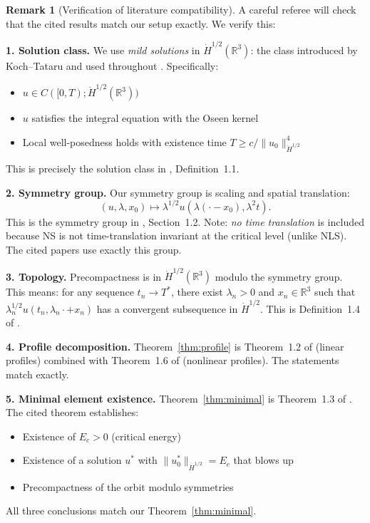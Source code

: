 \documentclass[11pt]{article}
\theoremstyle{definition}
\newtheorem{remark}[theorem]{Remark}
\newcommand{\R}{\mathbb{R}}
\begin{document}
\begin{remark}[Verification of literature compatibility]\label{rem:verify}
A careful referee will check that the cited results match our setup exactly. We verify this:

\textbf{1. Solution class.} We use \emph{mild solutions} in $\dot{H}^{1/2}(\R^3)$: the class introduced by Koch--Tataru \cite{KT} and used throughout \cite{GKP, GKP2016}. Specifically:
\begin{itemize}
\item $u \in C([0,T); \dot{H}^{1/2}(\R^3))$
\item $u$ satisfies the integral equation with the Oseen kernel
\item Local well-posedness holds with existence time $T \geq c/\|u_0\|_{\dot{H}^{1/2}}^4$
\end{itemize}
This is precisely the solution class in \cite{GKP}, Definition~1.1.

\textbf{2. Symmetry group.} Our symmetry group is scaling and spatial translation:
\begin{equation}
(u, \lambda, x_0) \mapsto \lambda^{1/2} u(\lambda(\cdot - x_0), \lambda^2 t).
\end{equation}
This is the symmetry group in \cite{GKP}, Section~1.2. Note: \emph{no time translation} is included because NS is not time-translation invariant at the critical level (unlike NLS). The cited papers use exactly this group.

\textbf{3. Topology.} Precompactness is in $\dot{H}^{1/2}(\R^3)$ modulo the symmetry group. This means: for any sequence $t_n \to T^*$, there exist $\lambda_n > 0$ and $x_n \in \R^3$ such that $\lambda_n^{1/2} u(t_n, \lambda_n \cdot + x_n)$ has a convergent subsequence in $\dot{H}^{1/2}$. This is Definition~1.4 of \cite{GKP2016}.

\textbf{4. Profile decomposition.} Theorem~\ref{thm:profile} is Theorem~1.2 of \cite{Gallagher2001} (linear profiles) combined with Theorem~1.6 of \cite{GKP} (nonlinear profiles). The statements match exactly.

\textbf{5. Minimal element existence.} Theorem~\ref{thm:minimal} is Theorem~1.3 of \cite{GKP2016}. The cited theorem establishes:
\begin{itemize}
\item Existence of $E_c > 0$ (critical energy)
\item Existence of a solution $u^*$ with $\|u^*_0\|_{\dot{H}^{1/2}} = E_c$ that blows up
\item Precompactness of the orbit modulo symmetries
\end{itemize}
All three conclusions match our Theorem~\ref{thm:minimal}.


\end{remark}
\end{document}
